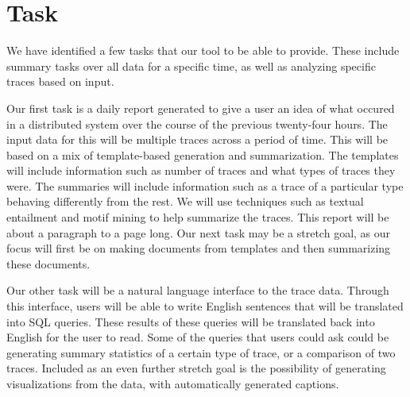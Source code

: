 \section{Task}

We have identified a few tasks that our tool to be able to provide. These include summary tasks over all data for a specific time,
as well as analyzing specific traces based on input. 

Our first task is a daily report generated to give a user an idea of what occured in a distributed system over the course 
of the previous twenty-four hours. The input data for this will be multiple traces across a period of time. This will be 
based on a mix of template-based generation and summarization. The templates will include information such as number of traces
and what types of traces they were. The summaries will include information such as a trace of a particular type behaving differently
from the rest. We will use techniques such as textual entailment and motif mining to help summarize the traces. This report
will be about a paragraph to a page long. Our next task may be a stretch goal, as our focus will first be on making documents from templates
and then summarizing these documents.

Our other task will be a natural language interface to the trace data. Through this interface, users will be able to write English sentences that will be
translated into SQL queries. These results of these queries will be translated back into English for the user to read. Some of the 
queries that users could ask could be generating summary statistics of a certain type of trace, or a comparison of two traces. Included as an even further stretch
goal is the possibility of generating visualizations from the data, with automatically generated captions. 
